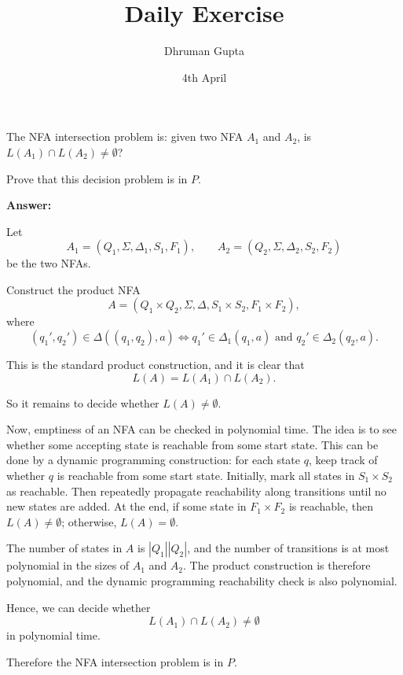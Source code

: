 \documentclass[11pt]{article}
\title{Daily Exercise}
\author{Dhruman Gupta}
\date{4th April}
\begin{document}

The NFA intersection problem is: given two NFA $A_1$ and $A_2$, is $L(A_1) \cap L(A_2) \neq \emptyset$?

Prove that this decision problem is in $P$.

\textbf{Answer:}

Let
\[
A_1 = (Q_1, \Sigma, \Delta_1, S_1, F_1), \qquad A_2 = (Q_2, \Sigma, \Delta_2, S_2, F_2)
\]
be the two NFAs.

Construct the product NFA
\[
A = (Q_1 \times Q_2, \Sigma, \Delta, S_1 \times S_2, F_1 \times F_2),
\]
where
\[
(q_1', q_2') \in \Delta((q_1, q_2), a)
\iff
q_1' \in \Delta_1(q_1, a) \text{ and } q_2' \in \Delta_2(q_2, a).
\]

This is the standard product construction, and it is clear that
\[
L(A) = L(A_1) \cap L(A_2).
\]

So it remains to decide whether $L(A) \neq \emptyset$.

Now, emptiness of an NFA can be checked in polynomial time. The idea is to see whether some accepting state is reachable from some start state. This can be done by a dynamic programming construction: for each state $q$, keep track of whether $q$ is reachable from some start state. Initially, mark all states in $S_1 \times S_2$ as reachable. Then repeatedly propagate reachability along transitions until no new states are added. At the end, if some state in $F_1 \times F_2$ is reachable, then $L(A) \neq \emptyset$; otherwise, $L(A) = \emptyset$.

The number of states in $A$ is $|Q_1||Q_2|$, and the number of transitions is at most polynomial in the sizes of $A_1$ and $A_2$. The product construction is therefore polynomial, and the dynamic programming reachability check is also polynomial.

Hence, we can decide whether
\[
L(A_1) \cap L(A_2) \neq \emptyset
\]
in polynomial time.

Therefore the NFA intersection problem is in $P$.
\end{document}
